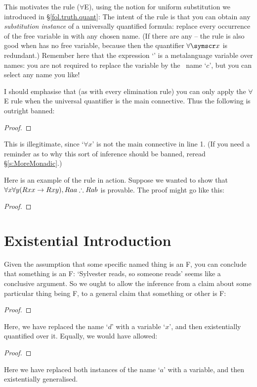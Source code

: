 This motivates the  rule ($\forall$E), using the notion for uniform substitution we introduced in §\ref{fol.truth.quant}:
The intent of the rule is that you can obtain any \emph{substitution instance} of a universally quantified formula: replace every occurrence of the free variable  in  with any chosen name. (If there are any – the rule is also good when  has no free variable, because then the quantifier $\forall\meta{x}$ is redundant.) Remember here that the expression `' is a metalanguage variable over names: you are not required to replace the variable  by the \FOL\ name `$c$', but you can select any name you like!

I should emphasise that (as with every elimination rule) you can only apply the $\forall$E rule when the universal quantifier is the main connective. Thus the following is outright banned:
\begin{proof}
\end{proof}
This is illegitimate, since `$\forall x$' is not the main connective in line 1. (If you need a reminder as to why this sort of inference should be banned, reread §\ref{s:MoreMonadic}.)

Here is an example of the rule in action. Suppose we wanted to show that $\forall x \forall y (Rxx \rightarrow Rxy), Raa  \mathrel{\therefore} Rab$ is provable. The proof might go like this: \begin{proof}
\end{proof}



\section{Existential Introduction}\label{exint}
Given the assumption that some specific named thing is an F, you can conclude that something is an F: `Sylvester reads, so someone reads' seems like a conclusive argument. So we ought to allow the inference from a claim about some particular thing being F, to a general claim that something or other is F:
\begin{proof}
	 
\end{proof}
Here, we have replaced the name `$d$' with a variable `$x$', and then existentially quantified over it. Equally, we would have allowed:
\begin{proof}
	 
\end{proof}
Here we have replaced both instances of the name `$a$' with a variable, and then existentially generalised. 

